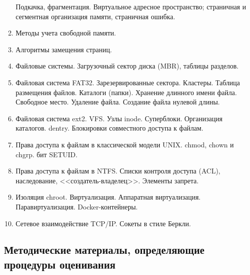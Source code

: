 \documentclass[a4paper,12pt]{article}
\begin{document}
\begin{enumerate}
Подкачка, фрагментация. Виртуальное адресное пространство; страничная и сегментная организация памяти,
страничная ошибка.
\item
Методы учета свободной памяти.
\item
Алгоритмы замещения страниц.
\item
Файловые системы. Загрузочный сектор диска (MBR), таблицы разделов.
\item
Файловая система FAT32. Зарезервированные сектора. Кластеры. Таблица размещения файлов.
Каталоги (папки). Хранение длинного имени файла. Свободное место. Удаление файла.
Создание файла нулевой длины.
\item
Файловая система ext2. VFS. Узлы inode. Суперблоки. Организация каталогов. dentry. Блокировки совместного доступа
к файлам.
\item
Права доступа к файлам в классической модели UNIX. chmod, chown и chgrp. бит SETUID.
\item
Права доступа к файлам в NTFS. Списки контроля доступа (ACL), наследование, <<создатель-владелец>>.
Элементы запрета.
\item
Изоляция chroot. Виртуализация. Аппаратная виртуализация. Паравиртуализация. Docker-контейнеры.
\item
Сетевое взаимодействие TCP/IP. Сокеты в стиле Беркли.
\end{enumerate}



\subsection{Методические материалы, определяющие процедуры оценивания}
\end{document}
